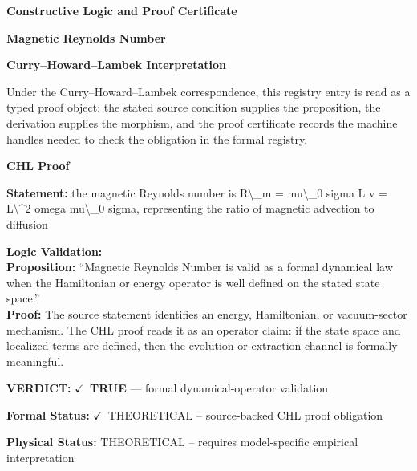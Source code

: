 \clearpage
\begingroup\tzpsupportsetup
\noindent\textbf{\fontsize{10.8pt}{12.8pt}\selectfont [ID 0236] Constructive Logic and Proof Certificate}\par
\noindent\textbf{\fontsize{10pt}{12pt}\selectfont Magnetic Reynolds Number}\par
\vspace{0.45em}
\begingroup
\footnotesize
\setlength{\parskip}{0.22em}
\setlength{\parindent}{0pt}
\noindent\textbf{Curry--Howard--Lambek Interpretation}\par
Under the Curry--Howard--Lambek correspondence, this registry entry is read as a typed proof
object: the stated source condition supplies the proposition, the derivation supplies the
morphism, and the proof certificate records the machine handles needed to check the obligation
in the formal registry.

\vspace{0.45em}
\noindent\textbf{CHL Proof}\par
\textbf{Statement:} the magnetic Reynolds number is R\textbackslash{}\_m = mu\textbackslash{}\_0 sigma L v = L\textbackslash{}\textasciicircum{}2 omega mu\textbackslash{}\_0 sigma,
representing the ratio of magnetic advection to diffusion

\textbf{Logic Validation:}\\
\textbf{Proposition:} ``Magnetic Reynolds Number is valid as a formal dynamical law when the Hamiltonian or
energy operator is well defined on the stated state space.''\\
\textbf{Proof:} The source statement identifies an energy, Hamiltonian, or vacuum-sector mechanism. The
CHL proof reads it as an operator claim: if the state space and localized terms are
defined, then the evolution or extraction channel is formally meaningful.

\textbf{VERDICT:} \ensuremath{\checkmark}\ \textbf{TRUE} --- formal dynamical-operator validation

\textbf{Formal Status:} \ensuremath{\checkmark}\ THEORETICAL -- source-backed CHL proof obligation

\textbf{Physical Status:} THEORETICAL -- requires model-specific empirical interpretation
\par\vspace{0.45em}
\par
\ifTZPDarkEdition
{}
\fi
\endgroup
\endgroup
